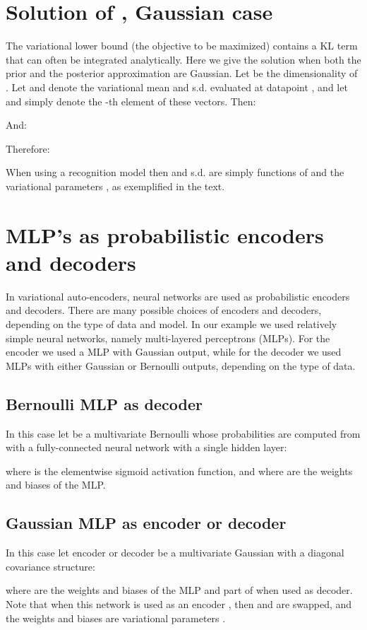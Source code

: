 \documentclass{article} \usepackage{nips13submit_e,times}
\theoremstyle{definition}
\theoremstyle{definition}
\begin{document}
\section{Solution of , Gaussian case}
\label{ap:kl_solution}
The variational lower bound (the objective to be maximized) contains a KL term that can often be integrated analytically. Here we give the solution when both the prior  and the posterior approximation  are Gaussian. Let  be the dimensionality of . Let  and  denote the variational mean and s.d. evaluated at datapoint , and let  and  simply denote the -th element of these vectors. Then:

And:

Therefore:

When using a recognition model  then  and s.d.  are simply functions of  and the variational parameters , as exemplified in the text.

\section{MLP's as probabilistic encoders and decoders}
\label{ap:encoders_decoders}
In variational auto-encoders, neural networks are used as probabilistic encoders and decoders. There are many possible choices of encoders and decoders, depending on the type of data and model. In our example we used relatively simple neural networks, namely multi-layered perceptrons (MLPs). For the encoder we used a MLP with Gaussian output, while for the decoder we used MLPs with either Gaussian or Bernoulli outputs, depending on the type of data.

\subsection{Bernoulli MLP as decoder}
In this case let  be a multivariate Bernoulli whose probabilities are computed from  with a fully-connected neural network with a single hidden layer:

where  is the elementwise sigmoid activation function, and where  are the weights and biases of the MLP.

\subsection{Gaussian MLP as encoder or decoder}
In this case let encoder or decoder be a multivariate Gaussian with a diagonal covariance structure:

where  are the weights and biases of the MLP and part of  when used as decoder. Note that when this network is used as an encoder , then  and  are swapped, and the weights and biases are variational parameters .
\end{document}
